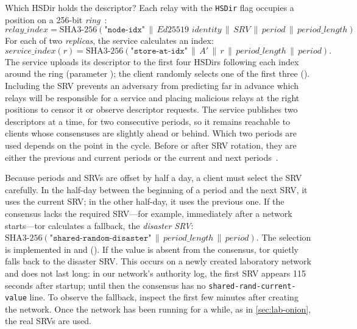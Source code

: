 Which HSDir holds the descriptor? Each relay with the \texttt{HSDir} flag occupies a position on a 256-bit \emph{ring}~:
\[
\mathit{relay\_index} = \mathrm{SHA3\text{-}256}(\texttt{"node-idx"} \,\|\, \textit{Ed25519 identity} \,\|\, \mathit{SRV} \,\|\, \mathit{period} \,\|\, \mathit{period\_length})
\]
For each of two \emph{replicas}, the service calculates an index:
\[
\mathit{service\_index}(r) = \mathrm{SHA3\text{-}256}(\texttt{"store-at-idx"} \,\|\, A' \,\|\, r \,\|\, \mathit{period\_length} \,\|\, \mathit{period}).
\]
The service uploads its descriptor to the first four HSDirs following each index around the ring (parameter ); the client randomly selects one of the first three (). Including the SRV prevents an adversary from predicting far in advance which relays will be responsible for a service and placing malicious relays at the right positions to censor it or observe descriptor requests. The service publishes two descriptors at a time, for two consecutive periods, so it remains reachable to clients whose consensuses are slightly ahead or behind. Which two periods are used depends on the point in the cycle. Before or after SRV rotation, they are either the previous and current periods or the current and next periods~.

\begin{approfondimento}
Because periods and SRVs are offset by half a day, a client must select the SRV carefully. In the half-day between the beginning of a period and the next SRV, it uses the current SRV; in the other half-day, it uses the previous one. If the consensus lacks the required SRV---for example, immediately after a network starts---tor calculates a fallback, the \emph{disaster SRV}: $\mathrm{SHA3\text{-}256}(\texttt{"shared-random-disaster"} \,\|\, \mathit{period\_length} \,\|\, \mathit{period})$. The selection is implemented in  and  (). If the value is absent from the consensus, tor quietly falls back to the disaster SRV. This occurs on a newly created laboratory network and does not last long: in our network's authority log, the first SRV appears 115 seconds after startup; until then the consensus has no \texttt{shared-rand-current-value} line. To observe the fallback, inspect the first few minutes after creating the network. Once the network has been running for a while, as in \cref{sec:lab-onion}, the real SRVs are used.
\end{approfondimento}


